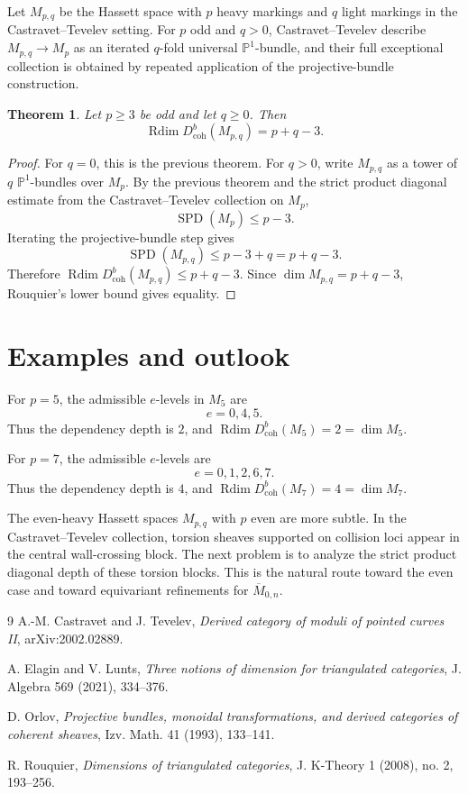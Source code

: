 \documentclass[11pt]{amsart}
\numberwithin{equation}{section}
\newtheorem{theorem}{Theorem}[section]
\theoremstyle{definition}
\DeclareMathOperator{\Rdim}{Rdim}
\DeclareMathOperator{\SPD}{SPD}
\newcommand{\Db}{D^b_{\mathrm{coh}}}
\begin{document}
Let $M_{p,q}$ be the Hassett space with $p$ heavy markings and $q$ light markings in the Castravet--Tevelev setting. For $p$ odd and $q>0$, Castravet--Tevelev describe $M_{p,q}\to M_p$ as an iterated $q$-fold universal $\mathbb P^1$-bundle, and their full exceptional collection is obtained by repeated application of the projective-bundle construction.

\begin{theorem}
Let $p\ge3$ be odd and let $q\ge0$. Then
\[
\Rdim \Db(M_{p,q})=p+q-3.
\]
\end{theorem}

\begin{proof}
For $q=0$, this is the previous theorem. For $q>0$, write $M_{p,q}$ as a tower of $q$ $\mathbb P^1$-bundles over $M_p$. By the previous theorem and the strict product diagonal estimate from the Castravet--Tevelev collection on $M_p$,
\[
\SPD(M_p)\le p-3.
\]
Iterating the projective-bundle step gives
\[
\SPD(M_{p,q})\le p-3+q=p+q-3.
\]
Therefore $\Rdim \Db(M_{p,q})\le p+q-3$. Since $\dim M_{p,q}=p+q-3$, Rouquier's lower bound gives equality.
\end{proof}

\section{Examples and outlook}

For $p=5$, the admissible $e$-levels in $M_5$ are
\[
e=0,4,5.
\]
Thus the dependency depth is $2$, and $\Rdim \Db(M_5)=2=\dim M_5$.

For $p=7$, the admissible $e$-levels are
\[
e=0,1,2,6,7.
\]
Thus the dependency depth is $4$, and $\Rdim \Db(M_7)=4=\dim M_7$.

The even-heavy Hassett spaces $M_{p,q}$ with $p$ even are more subtle. In the Castravet--Tevelev collection, torsion sheaves supported on collision loci appear in the central wall-crossing block. The next problem is to analyze the strict product diagonal depth of these torsion blocks. This is the natural route toward the even case and toward equivariant refinements for $\overline M_{0,n}$.

\begin{thebibliography}{9}
A.-M. Castravet and J. Tevelev, \emph{Derived category of moduli of pointed curves II}, arXiv:2002.02889.

A. Elagin and V. Lunts, \emph{Three notions of dimension for triangulated categories}, J. Algebra 569 (2021), 334--376.

D. Orlov, \emph{Projective bundles, monoidal transformations, and derived categories of coherent sheaves}, Izv. Math. 41 (1993), 133--141.

R. Rouquier, \emph{Dimensions of triangulated categories}, J. K-Theory 1 (2008), no. 2, 193--256.
\end{thebibliography}
\end{document}
